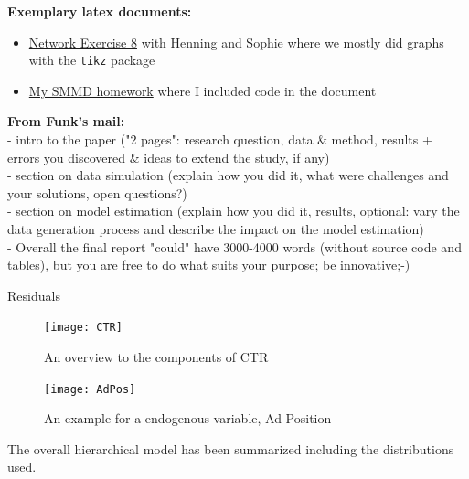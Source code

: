 \textbf{Exemplary latex documents:}
\begin{itemize}
    \item \href{https://v2.overleaf.com/read/vdvhrkdzyvqp}{Network Exercise 8} with Henning and Sophie where we mostly did graphs with the \texttt{tikz} package
    \item \href{https://v2.overleaf.com/read/sydtwzsdgqjx}{My SMMD homework} where I included code in the document
\end{itemize}

\textbf{From Funk's mail:}\\
- intro to the paper ("2 pages": research question, data \& method, results + errors you discovered \& ideas to extend the study, if any)\\
- section on data simulation (explain how you did it, what were challenges and your solutions, open questions?)\\
- section on model estimation (explain how you did it, results, optional: vary the data generation process and describe the impact on the model estimation)\\
- Overall the final report "could" have 3000-4000 words (without source code and tables), but you are free to do what suits your purpose; be innovative;-)

Residuals
\begin{figure}
    \centering
    \texttt{[image: CTR]}
    \caption{An overview to the components of CTR}
    \label{fig:CTR}
\end{figure}

\begin{figure}
    \centering
    \texttt{[image: AdPos]}
    \caption{An example for a endogenous variable, Ad Position}
    \label{fig:AdPos}
\end{figure}

The overall hierarchical model has been summarized including the distributions used. %

